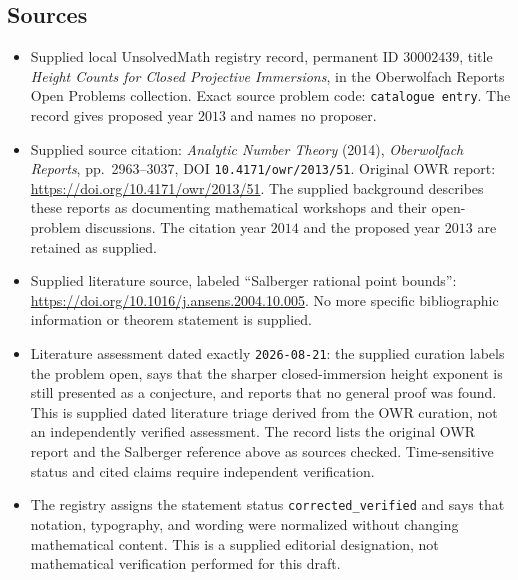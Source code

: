 \documentclass[11pt]{article}
\begin{document}
\subsection{Sources}
\begin{itemize}
\item Supplied local UnsolvedMath registry record, permanent ID \(30002439\), title \emph{Height Counts for Closed Projective Immersions}, in the Oberwolfach Reports Open Problems collection. Exact source problem code: \texttt{catalogue entry}. The record gives proposed year \(2013\) and names no proposer.
\item Supplied source citation: \emph{Analytic Number Theory} (2014), \emph{Oberwolfach Reports}, pp.\ 2963--3037, DOI \texttt{10.4171/owr/2013/51}. Original OWR report: \url{https://doi.org/10.4171/owr/2013/51}. The supplied background describes these reports as documenting mathematical workshops and their open-problem discussions. The citation year \(2014\) and the proposed year \(2013\) are retained as supplied.
\item Supplied literature source, labeled ``Salberger rational point bounds'': \url{https://doi.org/10.1016/j.ansens.2004.10.005}. No more specific bibliographic information or theorem statement is supplied.
\item Literature assessment dated exactly \texttt{2026-08-21}: the supplied curation labels the problem open, says that the sharper closed-immersion height exponent is still presented as a conjecture, and reports that no general proof was found. This is supplied dated literature triage derived from the OWR curation, not an independently verified assessment. The record lists the original OWR report and the Salberger reference above as sources checked. Time-sensitive status and cited claims require independent verification.
\item The registry assigns the statement status \texttt{corrected\_verified} and says that notation, typography, and wording were normalized without changing mathematical content. This is a supplied editorial designation, not mathematical verification performed for this draft.
\end{itemize}
\end{document}
